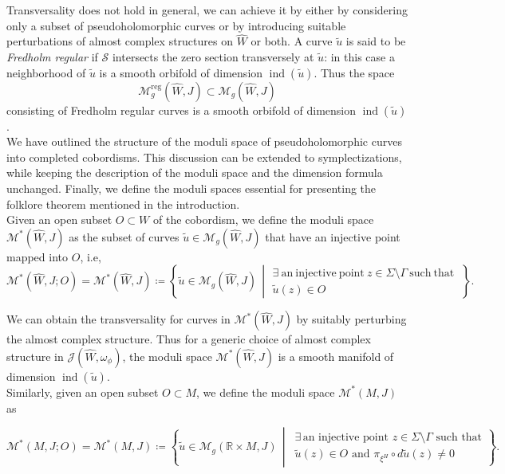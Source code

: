 \documentclass[11pt, a4paper]{amsart}
\newcommand{\cJ}{\mathcal{J}}
\newcommand{\cM}{\mathcal{M}}
\newcommand{\cS}{\mathcal{S}}
\DeclareMathOperator{\ind}{ind}
\begin{document}
Transversality does not hold in general, we can achieve it by either by considering only a subset of pseudoholomorphic curves or by introducing suitable perturbations of almost complex structures on $\widehat{W}$ or both. A curve $\tilde{u}$ is said to be \textit{Fredholm regular} if $\cS$ intersects the zero section transversely at $\tilde{u}$: in this case a neighborhood of $\tilde{u}$ is a smooth orbifold of dimension $\ind(\tilde{u})$. Thus the space 
$$\cM_g^{\mathrm{reg}}(\widehat{W},J) \subset \cM_g(\widehat{W},J)$$ consisting of Fredholm regular curves is a smooth orbifold of dimension $\ind(\tilde{u})$.\\

We have outlined the structure of the moduli space of pseudoholomorphic curves into completed cobordisms. This discussion can be extended to symplectizations, while keeping the description of the moduli space and the dimension formula unchanged. Finally, we define the moduli spaces essential for presenting the folklore theorem mentioned in the introduction.\\

Given an open subset $O \subset W$ of the cobordism, we define the moduli space $\cM^*(\widehat{W},J)$ as the subset of curves $\tilde{u} \in \cM_g(\widehat{W},J)$ that have an injective point mapped into $O$, i.e,
\begin{equation*}
\cM^*(\widehat{W},J;O) = \cM^*(\widehat{W},J)\coloneqq \left\{ \tilde{u}\in \cM_g(\widehat{W},J) \, \middle|
\begin{array}{c}
\exists \mathrm{\ an\ injective\ point\ } z\in \Sigma\setminus \Gamma \mathrm{\ such \ that\ }\\ \tilde{u}(z) \in O
\end{array}
\right\}.
\end{equation*}
\vspace{1pt}

We can obtain the transversality for curves in $\cM^*(\widehat{W},J)$ by suitably perturbing the almost complex structure. Thus for a generic choice of almost complex structure in $\cJ(\widehat{W},\omega_{\phi})$, the moduli space $\cM^*(\widehat{W},J)$ is a smooth manifold of dimension $\ind(\tilde{u})$.\\

Similarly, given an open subset $O \subset M$, we define the moduli space $\cM^*(M,J)$ as
 
\begin{equation*}
\cM^*(M,J;O) = \cM^*(M,J)\coloneqq \left\{ 
\tilde{u}\in \cM_g(\mathbb{R}\times M,J) \,\middle|\,
\begin{array}{c}
\exists \, \text{an injective point } z \in \Sigma \setminus \Gamma \text{ such that} \\
\tilde{u}(z) \in O \text{ and } \pi_{\xi^H} \circ d\tilde{u}(z) \neq 0
\end{array}
\right\}.
\end{equation*}
\vspace{1pt}
\end{document}
